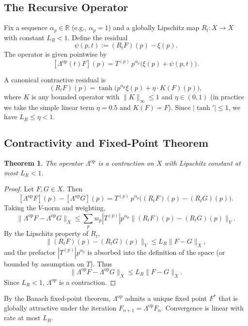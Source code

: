 \documentclass[11pt, a4paper]{article}
\newtheorem{theorem}{Theorem}
\begin{document}
\subsection{The Recursive Operator}

Fix a sequence \(\alpha_p \in \mathbb{R}\) (e.g., \(\alpha_p = 1\)) and a globally Lipschitz map \(R_t : X \to X\) with constant \(L_R < 1\). Define the residual
\[
\psi(p,t) := (R_t F)(p) - \xi(p).
\]
The operator is given pointwise by
\[
[\Lambda^{\mathrm{op}}(t) F](p) = T^{(p)}\, p^{\alpha_p} \bigl( \xi(p) + \psi(p,t) \bigr).
\]

A canonical contractive residual is
\[
(R_t F)(p) = \tanh\!\bigl( p^{\alpha_p} \xi(p) + \eta \cdot K(F)(p) \bigr),
\]
where \(K\) is any bounded operator with \(\|K\|_\infty \leq 1\) and \(\eta \in (0,1)\) (in practice we take the simple linear term \(\eta = 0.5\) and \(K(F) = F\)). Since \(|\tanh'| \leq 1\), we have \(L_R \leq \eta < 1\).

\subsection{Contractivity and Fixed-Point Theorem}

\begin{theorem}
The operator \(\Lambda^{\mathrm{op}}\) is a contraction on \(X\) with Lipschitz constant at most \(L_R < 1\).
\end{theorem}

\begin{proof}
Let \(F,G \in X\). Then
\[
[\Lambda^{\mathrm{op}} F](p) - [\Lambda^{\mathrm{op}} G](p) = T^{(p)}\, p^{\alpha_p} \bigl( (R_t F)(p) - (R_t G)(p) \bigr).
\]
Taking the \(V\)-norm and weighting,
\[
\| \Lambda^{\mathrm{op}} F - \Lambda^{\mathrm{op}} G \|_X \leq \sum_p w_p |T^{(p)}| p^{\alpha_p} \| (R_t F)(p) - (R_t G)(p) \|_V.
\]
By the Lipschitz property of \(R_t\),
\[
\| (R_t F)(p) - (R_t G)(p) \|_V \leq L_R \|F - G\|_X,
\]
and the prefactor \(|T^{(p)}| p^{\alpha_p}\) is absorbed into the definition of the space (or bounded by assumption on \(T\)). Thus
\[
\| \Lambda^{\mathrm{op}} F - \Lambda^{\mathrm{op}} G \|_X \leq L_R \|F - G\|_X.
\]
Since \(L_R < 1\), \(\Lambda^{\mathrm{op}}\) is a contraction.
\end{proof}

\begin{corollary}
By the Banach fixed-point theorem, \(\Lambda^{\mathrm{op}}\) admits a unique fixed point \(F^*\) that is globally attractive under the iteration \(F_{n+1} = \Lambda^{\mathrm{op}} F_n\). Convergence is linear with rate at most \(L_R\).
\end{corollary}
\end{document}
